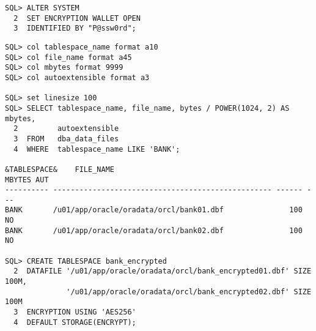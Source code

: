 \begin{enumerate}
\begin{lstlisting}[language=oracle_sql]
SQL> ALTER SYSTEM
  2  SET ENCRYPTION WALLET OPEN
  3  IDENTIFIED BY "P@ssw0rd";
    \end{lstlisting}
\clearpage
    \begin{lstlisting}[language=oracle_sql,alsolanguage=sqlplus]
SQL> col tablespace_name format a10
SQL> col file_name format a45
SQL> col mbytes format 9999
SQL> col autoextensible format a3

SQL> set linesize 100
SQL> SELECT tablespace_name, file_name, bytes / POWER(1024, 2) AS mbytes,
  2         autoextensible
  3  FROM   dba_data_files
  4  WHERE  tablespace_name LIKE 'BANK';

&TABLESPACE&    FILE_NAME                                         MBYTES AUT
---------- -------------------------------------------------- ------ ---
BANK       /u01/app/oracle/oradata/orcl/bank01.dbf               100 NO
BANK       /u01/app/oracle/oradata/orcl/bank02.dbf               100 NO

SQL> CREATE TABLESPACE bank_encrypted
  2  DATAFILE '/u01/app/oracle/oradata/orcl/bank_encrypted01.dbf' SIZE 100M,
              '/u01/app/oracle/oradata/orcl/bank_encrypted02.dbf' SIZE 100M
  3  ENCRYPTION USING 'AES256'
  4  DEFAULT STORAGE(ENCRYPT);
    \end{lstlisting}
\end{enumerate}
\clearpage